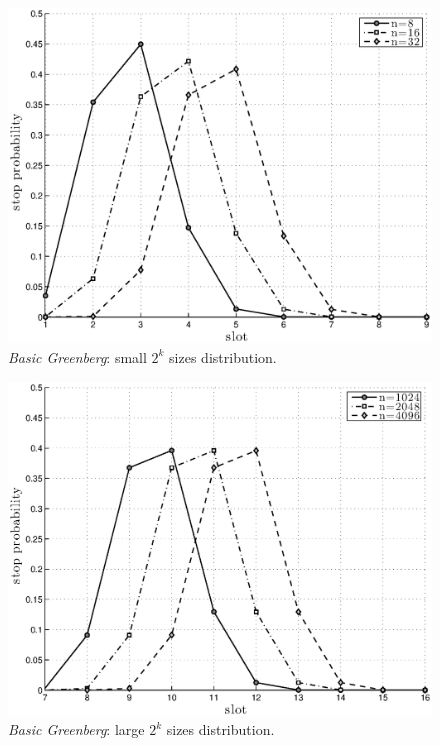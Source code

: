 \documentclass[12pt,a4paper]{report}
\begin{document}
\begin{figure}[htbp]
\begin{center}
\includegraphics[scale=0.7]{matlab/Greenberg_stop_prob/greenberg-stop-distribution-uniformity-init}
\caption{\emph{Basic Greenberg}:  small $2^{k}$ sizes distribution.}
\label{fig:greenberg-dist-small}
\end{center}
\end{figure}


\begin{figure}[H]
\begin{center}
\includegraphics[scale=0.7]{matlab/Greenberg_stop_prob/greenberg-stop-distribution-uniformity}
\caption{\emph{Basic Greenberg}:  large $2^{k}$ sizes distribution.}
\label{fig:greenberg-dist-large}
\end{center}
\end{figure}
\end{document}

